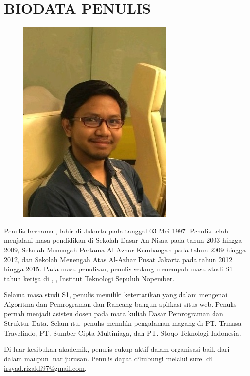 
\chapter{BIODATA PENULIS}

\begin{figure}
	\includegraphics[height=0.25\textheight]{figures/william.jpg}
\end{figure}

Penulis bernama \penulis, lahir di Jakarta pada tanggal 03 Mei 1997.
Penulis telah menjalani masa pendidikan di Sekolah Dasar An-Nisaa pada tahun 2003 hingga 2009,
Sekolah Menengah Pertama Al-Azhar Kembangan pada tahun 2009 hingga 2012,
dan Sekolah Menengah Atas Al-Azhar Pusat Jakarta pada tahun 2012 hingga 2015.
Pada masa penulisan, penulis sedang menempuh masa studi S1 tahun ketiga di \jurusan, \fakultas,
Institut Teknologi Sepuluh Nopember.

Selama masa studi S1, penulis memiliki ketertarikan yang dalam mengenai Algoritma dan Pemrograman dan
Rancang bangun aplikasi situs web.
Penulis pernah menjadi asisten dosen pada mata kuliah Dasar Pemrograman dan Struktur Data.
Selain itu, penulis memiliki pengalaman magang di PT. Trinusa Travelindo, PT. Sumber Cipta Multiniaga,
dan PT. Stoqo Teknologi Indonesia.

Di luar kesibukan akademik, penulis cukup aktif dalam organisasi baik dari dalam maupun luar jurusan.
Penulis dapat dihubungi melalui surel di \href{mailto:irsyad.rizaldi97@gmail.com}{irsyad.rizaldi97@gmail.com}.
